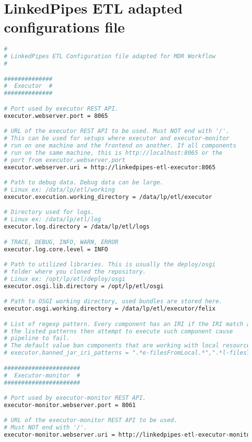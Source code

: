 
\section{LinkedPipes ETL adapted configurations file}
\label{sec:appendinx1}

	\begin{lstlisting}[language=bash,]
#
# LinkedPipes ETL Configuration file adapted for MDR Workflow
#

##############
#  Executor  #
##############

# Port used by executor REST API.
executor.webserver.port = 8065

# URL of the executor REST API to be used. Must NOT end with '/'.
# This can be used for setups where executor and executor-monitor
# run on one machine and the frontend on another. If all components
# run on the same machine, this is http://localhost:8065 or the
# port from executor.webserver.port
executor.webserver.uri = http://linkedpipes-etl-executor:8065

# Path to debug data. Debug data can be large.
# Linux ex: /data/lp/etl/working
executor.execution.working_directory = /data/lp/etl/executor

# Directory used for logs.
# Linux ex: /data/lp/etl/log
executor.log.directory = /data/lp/etl/logs

# TRACE, DEBUG, INFO, WARN, ERROR
executor.log.core.level = INFO

# Path to utilized libraries. This is usually the deploy/osgi
# folder where you cloned the repository.
# Linux ex: /opt/lp/etl/deploy/osgi
executor.osgi.lib.directory = /opt/lp/etl/osgi

# Path to OSGI working directory, used bundles are stored here.
executor.osgi.working.directory = /data/lp/etl/executor/felix

# List of regexp pattern. Every component has an IRI if the IRI match any of
# the listed patterns then attempt to execute such component cause
# pipeline to fail.
# The default value ban components that are working with local resources.
# executor.banned_jar_iri_patterns = ".*e-filesFromLocal.*",".*l-filesToLocal.*",".*x-deleteDirectory.*"

######################
#  Executor-monitor  #
######################

# Port used by executor-monitor REST API.
executor-monitor.webserver.port = 8061

# URL of the executor-monitor REST API to be used.
# Must NOT end with '/'.
executor-monitor.webserver.uri = http://linkedpipes-etl-executor-monitor:8061


\end{lstlisting}
